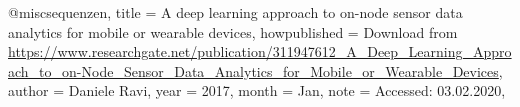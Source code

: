 @misc{sequenzen,
    title = {A deep learning approach to on-node sensor data analytics for mobile or wearable devices},
    howpublished = {Download from \url{https://www.researchgate.net/publication/311947612_A_Deep_Learning_Approach_to_on-Node_Sensor_Data_Analytics_for_Mobile_or_Wearable_Devices}},
    author = {Daniele Ravi},
    year = {2017},
    month = {Jan},
    note = {Accessed: 03.02.2020},
}
